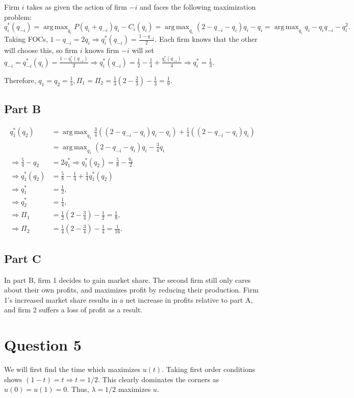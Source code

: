 \documentclass[11pt]{article} %
\DeclareMathOperator*{\argmax}{arg\,max}
\begin{document}
Firm $i$ takes as given the action of firm $-i$ and faces the following maximization problem: $q^{*}_{i}(q_{-i}) = \argmax_{q_i} P(q_i+q_{-i}) q_i - C_i (q_i) =  \argmax_{q_i} (2 - q_{-i} - q_i) q_i -q_i  =  \argmax_{q_i} q_i - q_iq_{-i} - q_i^2.$ Taking FOCs, $1 - q_{-i} = 2q_i \Rightarrow q^{*}_i(q_{-i}) = \frac{1-q_{-i}}{2}$. Each firm knows that the other will choose this, so firm $i$ knows firm $-i$ will set $q_{-i} = q^{*}_{-i}(q_i) = \frac{1-q_i^{*}(q_{-i})}{2} \Rightarrow q^{*}_i(q_{-i}) = \frac{1}{2} - \frac{1}{4} + \frac{q^{*}_i(q_{-i})}{4} \Rightarrow q^{*}_i = \frac{1}{3}.$

Therefore, $q_1 = q_2 = \frac{1}{3}, \Pi_1 = \Pi_2 = \frac{1}{3}(2-\frac{2}{3}) - \frac{1}{3} = \frac{1}{9}.$
\subsection{Part B}
\begin{align*}
q_1^{*}(q_2) &= \argmax_{q_1} \frac{3}{4}( (2 - q_{-i} - q_i) q_i -q_i) + \frac{1}{4}( (2 - q_{-i} - q_i) q_i) \\&= \argmax_{q_1}  (2 - q_{-i} - q_i) q_i -\frac{3}{4}q_i \\
\Rightarrow \frac{5}{4} - q_{2} &= 2q_1^{*} \Rightarrow q_1^{*}(q_2) = \frac{5}{8} - \frac{q_2}{2}\\
\Rightarrow  q_1^{*}(q_2) &=  \frac{5}{8} - \frac{1}{4} + \frac{1}{4}q_1^*(q_2)\\
\Rightarrow q_1^{*} &= \frac{1}{2},\\
\Rightarrow q_2^{*} &= \frac{1}{4},\\
\Rightarrow \Pi_1 &= \frac{1}{2}\left(2 - \frac{3}{4}\right) - \frac{1}{2} = \frac{1}{8},\\
\Rightarrow \Pi_2 &= \frac{1}{4}\left(2 - \frac{3}{4}\right) - \frac{1}{4} = \frac{1}{16}.
\end{align*}

\subsection{Part C}
In part B, firm 1 decides to gain market share. The second firm still only cares about their own profits, and maximizes profit by reducing their production. Firm 1's increased market share results in a net increase in profits relative to part A, and firm 2 suffers a loss of profit as a result.
\section{Question 5}
We will first find the time which maximizes $u(t)$. Taking first order conditions shows $(1-t) = t \Rightarrow t = 1/2.$ This clearly dominates the corners as $u(0) = u(1) = 0$. Thus, $\lambda = 1/2$ maximizes $u$.
\end{document}
